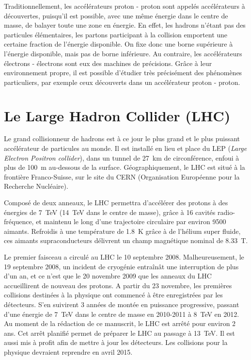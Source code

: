 Traditionnellement, les accélérateurs proton - proton sont appelés accélérateurs à découvertes, puisqu'il est possible, avec une même énergie dans le centre de masse, de balayer toute une zone en énergie. En effet, les hadrons n'étant pas des particules élémentaires, les partons participant à la collision emportent une certaine fraction de l'énergie disponible. On fixe donc une borne supérieure à l'énergie disponible, mais pas de borne inférieure. Au contraire, les accélérateurs électrons - électrons sont eux des machines de précisions. Grâce à leur environnement propre, il est possible d'étudier très précisément des phénomènes particuliers, par exemple ceux découverts dans un accélérateur proton - proton.

\section{Le Large Hadron Collider (LHC)}

Le grand collisionneur de hadrons est à ce jour le plus grand et le plus puissant accélérateur de particules au monde. Il est installé en lieu et place du LEP (\emph{Large Electron Positron collider}), dans un tunnel de \SI{27}{\km} de circonférence, enfoui à plus de \SI{100}{\m} au-dessous de la surface. Géographiquement, le LHC est situé à la frontière Franco-Suisse, sur le site du CERN (Organisation Européenne pour la Recherche Nucléaire).

Composé de deux anneaux, le LHC permettra d'accélérer des protons à des énergies de \SI{7}{\TeV} (\SI{14}{\TeV} dans le centre de masse), grâce à 16 cavités radio-fréquence, et maintenu le long d'une trajectoire circulaire par environ 9500 aimants. Refroidis à une température de \SI{1.8}{\K} grâce à de l'hélium super fluide, ces aimants supraconducteurs délivrent un champ magnétique nominal de \SI{8.33}{\tesla}.

Le premier faisceau a circulé au LHC le 10 septembre 2008. Malheureusement, le 19 septembre 2008, un incident de cryogénie entraînât une interruption de plus d'un an, et ce n'est que le 20 novembre 2009 que les anneaux du LHC accueillirent de nouveau des protons. A partir du 23 novembre, les premières collisions \Pproton{}\Pproton{} destinées à la physique ont commencé à être enregistrées par les détecteurs. S'en suivirent 3 années de montée en puissance progressive, passant d'une énergie de \SI{7}{\TeV} dans le centre de masse en 2010-2011 à \SI{8}{\TeV} en 2012. Au moment de la rédaction de ce manuscrit, le LHC est arrêté pour environ 2 ans. Cet arrêt planifié permet de préparer le LHC au passage à \SI{13}{\TeV}. Il est aussi mis à profit afin de mettre à jour les détecteurs. Les collisions \Pproton{}\Pproton{} pour la physique devraient reprendre en avril 2015.

